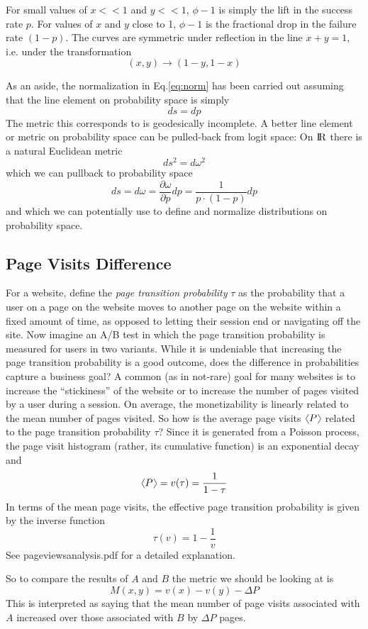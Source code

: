 \documentclass[12pt]{report}
\newcommand{\beq}{\begin{equation}} %
\newcommand{\eeq}{\end{equation}} %
\newcommand{\bdm}{\begin{displaymath}} %
\newcommand{\edm}{\end{displaymath}} %
\newcommand{\reals}{{\rm I\! R}} %
\newcommand{\langl}{\begin{picture}(4.5,7)
\put(1.1,2.5){\rotatebox{60}{\line(1,0){5.5}}}
\put(1.1,2.5){\rotatebox{300}{\line(1,0){5.5}}}
\end{picture}}
\newcommand{\rangl}{\begin{picture}(4.5,7)
\put(.9,2.5){\rotatebox{120}{\line(1,0){5.5}}}
\put(.9,2.5){\rotatebox{240}{\line(1,0){5.5}}}
\end{picture}}
\newcommand{\mymean}[1]{\ensuremath{\langl{#1}\rangl}} %
\begin{document}
For small values of \(x<<1\) and \(y<<1\), \(\phi-1\) is simply the lift in
the success rate \(p\). For values of \(x\) and \(y\) close to 1,
\(\phi-1\) is the
fractional drop in the failure rate \((1-p)\). The curves are symmetric under
reflection in the line \(x+y = 1\), i.e. under the transformation
\bdm
(x,y)\rightarrow (1-y,1-x)
\edm

As an aside, the normalization in Eq.\ref{eq:norm}
has been carried out assuming that the
line element on probability space is simply
\bdm
ds = dp
\edm
The metric this corresponds to is geodesically incomplete. A better line
element or metric on probability space can be pulled-back from logit space:
On \(\reals\) there is a
natural Euclidean metric
\bdm
ds^2 = d\omega^2
\edm
which we can pullback to probability space
\bdm
ds = d\omega = \frac{\partial \omega}{\partial p}dp = \frac{1}{p\cdot(1-p)}dp
\edm
and which we can potentially use to define and normalize distributions on
probability space.

\subsection{Page Visits Difference}\label{sec:vdiff}
For a website, define the {\em page transition probability} \(\tau\)
as the probability that a user on a page on the website moves to
another page on the website within a fixed amount of time, as opposed
to letting their session end or navigating off the site. Now imagine
an A/B test in which the page transition probability is measured for
users in two variants. While it is undeniable that increasing the page
transition probability is a good outcome, does the difference in
probabilities capture a business goal? A common (as in not-rare) goal
for many websites is to increase the ``stickiness'' of the website or
to increase the number of pages visited by a user during a session. On
average, the monetizability is linearly related to the mean number of
pages visited. So how is the average page visits \mymean{P} related to
the page transition probability \(\tau\)? Since it is generated from a Poisson process, the page visit histogram (rather, its cumulative function) is an exponential decay and 
\beq\label{eq:visitstau}
\mymean{P} = v(\tau) = \frac{1}{1-\tau}
\eeq
In terms of the mean page visits, the effective page transition probability is given by the inverse function
\beq\label{eq:tauvisits}
\tau(v) = 1-\frac{1}{v}
\eeq
See pageviewsanalysis.pdf for a detailed explanation.

So to compare the results of \(A\) and \(B\) the metric we should be looking at
is
\beq
\label{eq:visitsdiff}
M(x,y) = v(x) - v(y)-\Delta P
\eeq
This is interpreted as saying that the mean number of page visits associated with \(A\) increased over those associated with \(B\) by \(\Delta P\) pages.
\end{document}
